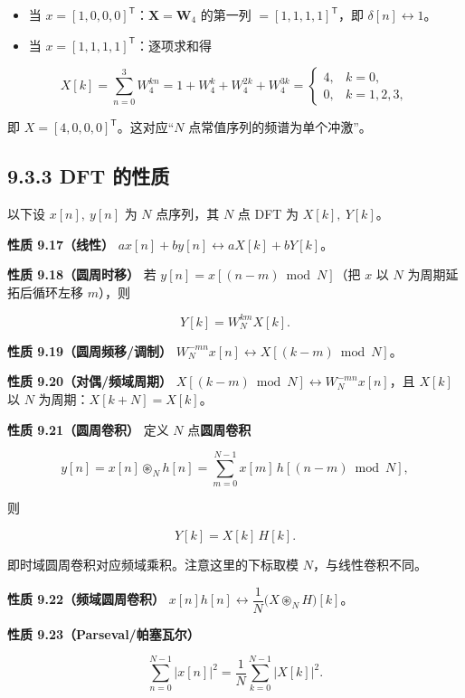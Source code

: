 \begin{itemize}
\tightlist
\item
  当 \(x=[1,0,0,0]^{\mathsf{T}}\)：\(\mathbf{X}=\mathbf{W}_4\) 的第一列
  \(=[1,1,1,1]^{\mathsf{T}}\)，即 \(\delta[n]\leftrightarrow 1\)。
\item
  当 \(x=[1,1,1,1]^{\mathsf{T}}\)：逐项求和得
\end{itemize}

\[
X[k]=\sum_{n=0}^{3} W_4^{kn}=1+W_4^k+W_4^{2k}+W_4^{3k}
=\begin{cases}4,& k=0,\\ 0,& k=1,2,3,\end{cases}
\]

即 \(X=[4,0,0,0]^{\mathsf{T}}\)。这对应``\(N\)
点常值序列的频谱为单个冲激''。

\subsection{9.3.3 DFT 的性质}\label{dft-ux7684ux6027ux8d28}

以下设 \(x[n],\ y[n]\) 为 \(N\) 点序列，其 \(N\) 点 DFT 为
\(X[k],\ Y[k]\)。

\textbf{性质 9.17（线性）}
\(a x[n]+b y[n] \leftrightarrow a X[k]+b Y[k]\)。

\textbf{性质 9.18（圆周时移）} 若 \(y[n]=x[(n-m)\bmod N]\)（把 \(x\) 以
\(N\) 为周期延拓后循环左移 \(m\)），则

\[
Y[k] = W_N^{km} X[k].
\]

\textbf{性质 9.19（圆周频移/调制）}
\(W_N^{-mn}x[n]\leftrightarrow X[(k-m)\bmod N]\)。

\textbf{性质 9.20（对偶/频域周期）}
\(X[(k-m)\bmod N]\leftrightarrow W_N^{-mn}x[n]\)，且 \(X[k]\) 以 \(N\)
为周期：\(X[k+N]=X[k]\)。

\textbf{性质 9.21（圆周卷积）} 定义 \(N\) 点\textbf{圆周卷积}

\[
y[n] = x[n]\circledast_N h[n]
= \sum_{m=0}^{N-1} x[m]\,h[(n-m)\bmod N],
\]

则

\[
Y[k] = X[k]\,H[k].
\]

即时域圆周卷积对应频域乘积。注意这里的下标取模 \(N\)，与线性卷积不同。

\textbf{性质 9.22（频域圆周卷积）}
\(x[n]h[n]\leftrightarrow \dfrac{1}{N}\bigl(X\circledast_N H\bigr)[k]\)。

\textbf{性质 9.23（Parseval/帕塞瓦尔）}

\[
\sum_{n=0}^{N-1} |x[n]|^2 = \frac{1}{N}\sum_{k=0}^{N-1} |X[k]|^2 .
\]

